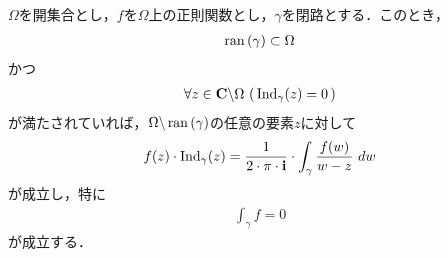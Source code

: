 	\begin{screen}
		\begin{thm}[Cauchyの積分定理]
			$\Omega$を開集合とし，$f$を$\Omega$上の正則関数とし，$\gamma$を閉路とする．このとき，
			\begin{align}
				\operatorname*{ran} \left(\gamma\right) \subset \Omega
			\end{align}
			かつ
			\begin{align}
				\forall z \in \mathbf{C} \backslash \Omega\, \left(\, \operatorname{Ind}_{\gamma}(z) = 0\, \right)
			\end{align}
			が満たされていれば，$\Omega \backslash \operatorname*{ran} \left(\gamma\right)$の任意の要素$z$に対して
			\begin{align}
				f(z) \cdot \operatorname{Ind}_{\gamma}(z) = \frac{1}{2\cdot\pi\cdot\mathbf{i}} \cdot \int_{\gamma} \frac{f(w)}{w - z}\ dw
			\end{align}
			が成立し，特に
			\begin{align}
				\int_\gamma f = 0
			\end{align}
			が成立する．
		\end{thm}
	\end{screen}
	

